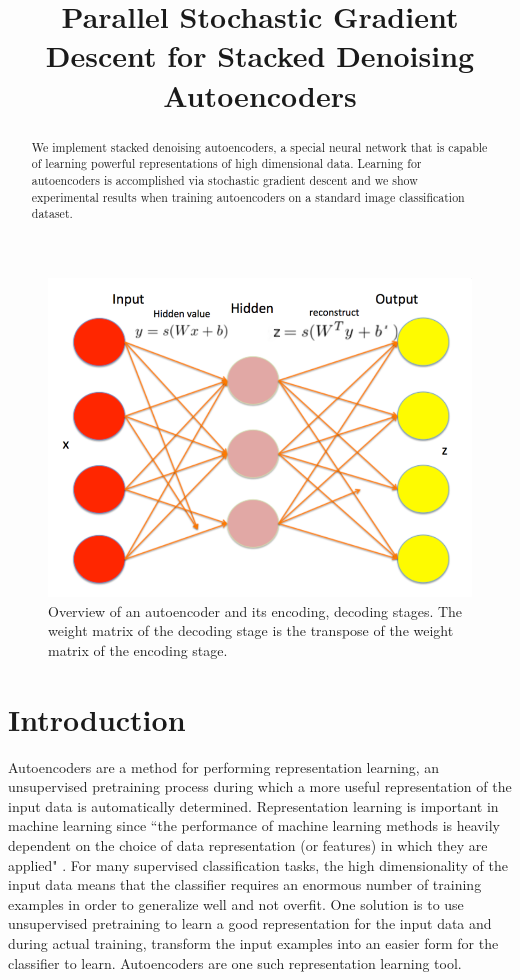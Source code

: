 \documentclass[conference]{IEEEtran}
\begin{document}
\title{Parallel Stochastic Gradient Descent for Stacked Denoising Autoencoders}

\author{
\and
{}
}

\maketitle

\begin{abstract}
We implement stacked denoising autoencoders, a special neural network that is capable of learning powerful representations of high dimensional data. Learning for autoencoders is accomplished via stochastic gradient descent and we show experimental results when training autoencoders on a standard image classification dataset. 
\end{abstract}

\begin{figure}[h]
\centering
\includegraphics[width=0.9\linewidth]{autoencoder.png}
\caption{Overview of an autoencoder and its encoding, decoding stages. The weight matrix of the decoding stage is the transpose of the weight matrix of the encoding stage.}
\label{fig:autoencoder}
\end{figure}

\section{Introduction}
Autoencoders are a method for performing representation learning, an unsupervised pretraining process during which a more useful representation of the
input data is automatically determined. Representation learning is important in machine learning since ``the performance of 
machine learning methods is heavily dependent on the choice of data representation (or features) in which they are applied" 
\cite{bengio2012rep}. For many supervised classification tasks, the high dimensionality of the input data means that the classifier requires an enormous number of training examples in order to generalize well and not overfit. One solution is to use unsupervised pretraining to learn a good representation for the input data and during actual training, transform the input examples into an easier form for the classifier to learn. Autoencoders are one such representation learning tool.
\end{document}
